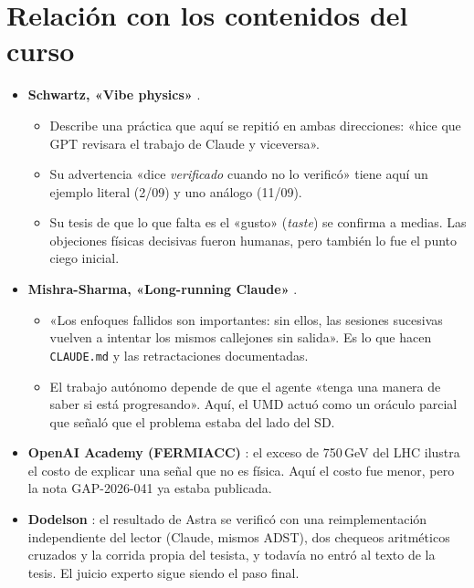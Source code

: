 \documentclass[11pt,a4paper]{article}
\newcommand{\code}[1]{\texttt{#1}}
\begin{document}
\section{Relación con los contenidos del curso}
\begin{itemize}
  \item \textbf{Schwartz, «Vibe physics»} \cite{schwartz}.
  \begin{itemize}
    \item Describe una práctica que aquí se repitió en ambas direcciones: «hice que GPT revisara el trabajo
    de Claude y viceversa».
    \item Su advertencia «dice \emph{verificado} cuando no lo verificó» tiene aquí un ejemplo literal (2/09)
    y uno análogo (11/09).
    \item Su tesis de que lo que falta es el «gusto» (\emph{taste}) se confirma a medias. Las objeciones
    físicas decisivas fueron humanas, pero también lo fue el punto ciego inicial.
  \end{itemize}
  \item \textbf{Mishra-Sharma, «Long-running Claude»} \cite{mishra}.
  \begin{itemize}
    \item «Los enfoques fallidos son importantes: sin ellos, las sesiones sucesivas vuelven a intentar los
    mismos callejones sin salida». Es lo que hacen \code{CLAUDE.md} y las retractaciones documentadas.
    \item El trabajo autónomo depende de que el agente «tenga una manera de saber si está progresando». Aquí,
    el UMD actuó como un oráculo parcial que señaló que el problema estaba del lado del SD.
  \end{itemize}
  \item \textbf{OpenAI Academy (FERMIACC)} \cite{openai}: el exceso de 750\,GeV del LHC ilustra el costo de
  explicar una señal que no es física. Aquí el costo fue menor, pero la nota GAP-2026-041 ya estaba publicada.
  \item \textbf{Dodelson} \cite{dodelson}: el resultado de Astra se verificó con una reimplementación
  independiente del lector (Claude, mismos ADST), dos chequeos aritméticos cruzados y la corrida propia del
  tesista, y todavía no entró al texto de la tesis. El juicio experto sigue siendo el paso final.
\end{itemize}
\end{document}
